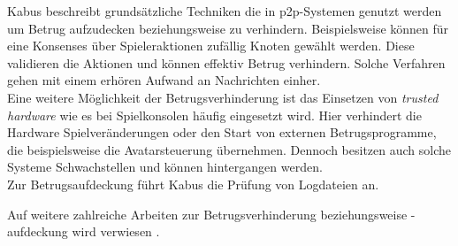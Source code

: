 Kabus \cite{Kabus2005Addressing} beschreibt grundsätzliche Techniken die in p2p-Systemen genutzt werden um Betrug aufzudecken beziehungsweise zu verhindern. Beispielsweise können für eine Konsenses über Spieleraktionen zufällig Knoten gewählt werden. Diese validieren die Aktionen und können effektiv Betrug verhindern. Solche Verfahren gehen mit einem erhören Aufwand an Nachrichten einher.\\
Eine weitere Möglichkeit der Betrugsverhinderung ist das Einsetzen von \emph{trusted hardware} wie es bei Spielkonsolen häufig eingesetzt wird. Hier verhindert die Hardware Spielveränderungen oder den Start von externen Betrugsprogramme, die beispielsweise die Avatarsteuerung übernehmen. Dennoch besitzen auch solche Systeme Schwachstellen und können hintergangen werden.\\
Zur Betrugsaufdeckung führt Kabus die Prüfung von Logdateien an.

Auf weitere zahlreiche Arbeiten zur Betrugsverhinderung beziehungsweise -aufdeckung wird verwiesen \cite{Ferretti2008Cheating, Gauthierdickey2004Low, Kabus2007Design, Dautermann2007, Kabus2009, Castro2002Secure}.
